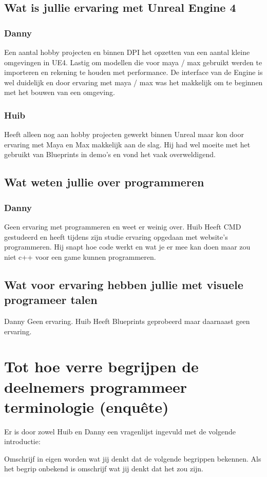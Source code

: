 \subsection*{Wat is jullie ervaring met Unreal Engine 4}
\subsubsection*{Danny}
Een aantal hobby projecten en binnen DPI het opzetten van een aantal kleine omgevingen in UE4. Lastig om modellen die voor maya / max gebruikt werden te importeren en rekening te houden met performance. De interface van de Engine is wel duidelijk en door ervaring met maya / max was het makkelijk om te beginnen met het bouwen van een omgeving.
\subsubsection*{Huib}
Heeft alleen nog aan hobby projecten gewerkt binnen Unreal maar kon door ervaring met Maya en Max makkelijk aan de slag. Hij had wel moeite met het gebruikt van Blueprints in demo’s en vond het vaak overweldigend.
\subsection*{Wat weten jullie over programmeren}
\subsubsection*{Danny}
Geen ervaring met programmeren en weet er weinig over.
Huib
Heeft CMD gestudeerd en heeft tijdens zijn studie ervaring opgedaan met website’s programmeren. Hij snapt hoe code werkt en wat je er mee kan doen maar zou niet c++ voor een game kunnen programmeren.
\subsection*{Wat voor ervaring hebben jullie met visuele programeer talen}
Danny
Geen ervaring.
Huib
Heeft Blueprints geprobeerd maar daarnaast geen ervaring.

\section[Enquête]{Tot hoe verre begrijpen de deelnemers programmeer terminologie (enquête)}
\label{appendix:oreintatieintervieuw:enquete}
Er is door zowel Huib en Danny een vragenlijst ingevuld met de volgende introductie:

Omschrijf in eigen worden wat jij denkt dat de volgende begrippen bekennen. Als het begrip onbekend is omschrijf wat jij denkt dat het zou zijn.

